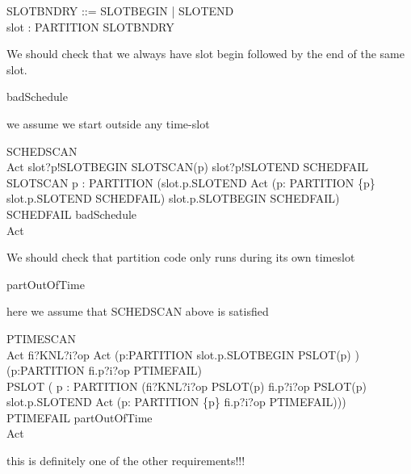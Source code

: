 \begin{circus}
	SLOTBNDRY ::= SLOTBEGIN | SLOTEND\\
	\circchannel slot : PARTITION \cross SLOTBNDRY
\end{circus}

We should check that we always have slot begin followed by the end of the
same slot.
\begin{circus}

\circchannel badSchedule
\end{circus}
we assume we start outside any time-slot
\begin{circus}
\circprocess SCHEDSCAN \circdef \circbegin\\
  Act \circdef slot?p!SLOTBEGIN \then  SLOTSCAN(p)
              \extchoice  slot?p!SLOTEND   \then  SCHEDFAIL\\
  SLOTSCAN \circdef \circvar p : PARTITION \circspot
        (slot.p.SLOTEND   \then  Act
        \extchoice  (\Extchoice  p: PARTITION \cap \{p\} \circspot slot.p.SLOTEND \then  SCHEDFAIL)
        \extchoice  slot.p.SLOTBEGIN \then  SCHEDFAIL)\\
  SCHEDFAIL \circdef badSchedule \then \Stop\\
\circspot Act\\
\circend
\end{circus}
We should check that partition code only runs during its own timeslot
\begin{circus}

\circchannel partOutOfTime
\end{circus}
here we assume that SCHEDSCAN above is satisfied
\begin{circus}
\circprocess PTIMESCAN \circdef \circbegin\\
  Act \circdef fi?KNL?i?op  \then  Act
            \extchoice  (\Extchoice  p:PARTITION \circspot slot.p.SLOTBEGIN \then  PSLOT(p) )
            \extchoice  (\Extchoice  p:PARTITION \circspot fi.p?i?op        \then  PTIMEFAIL)\\
PSLOT  \circdef( \circvar p : PARTITION \circspot (fi?KNL?i?op    \then  PSLOT(p)
            \extchoice  fi.p?i?op      \then  PSLOT(p)
            \extchoice  slot.p.SLOTEND \then  Act
            \extchoice  (\Extchoice  p: PARTITION \cap \{p\} \circspot fi.p?i?op \then  PTIMEFAIL)))\\
PTIMEFAIL \circdef partOutOfTime \then  \Stop\\
\circspot Act\\
\circend
\end{circus}
this is definitely one of the other requirements!!!

